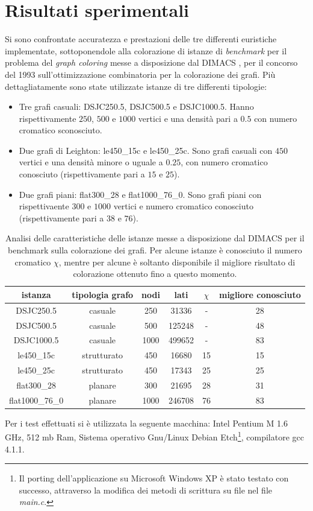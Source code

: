 \documentclass[a4paper,10pt]{article}
\begin{document}
\section{Risultati sperimentali}
Si sono confrontate accuratezza e prestazioni delle tre differenti euristiche implementate, sottoponendole alla colorazione di istanze di \emph{benchmark} per il problema del \emph{graph coloring} messe a disposizione dal DIMACS \cite{dimacs}, per il concorso del 1993 sull'ottimizzazione combinatoria per la colorazione dei grafi.
Più dettagliatamente sono state utilizzate istanze di tre differenti tipologie:
\begin{itemize}
    \item Tre grafi casuali: DSJC250.5, DSJC500.5 e DSJC1000.5. Hanno rispettivamente $250$, $500$ e $1000$ vertici e una densità pari a $0.5$ con numero cromatico sconosciuto.
    \item Due grafi di Leighton: le450\_15c e le450\_25c. Sono grafi casuali con $450$ vertici e una densità minore o uguale a $0.25$, con numero cromatico conosciuto (rispettivamente pari a $15$ e $25$).
    \item Due grafi piani: flat300\_28 e flat1000\_76\_0. Sono grafi piani con rispettivaente $300$ e $1000$ vertici e numero cromatico conosciuto (rispettivamente pari a $38$ e $76$).
\end{itemize}

\begin{table}[h]
\begin{center}
\begin{tabular}{|c|c|c|c|c|c|}
\hline
istanza         &tipologia grafo     &nodi   &lati   &$\chi$ &migliore conosciuto\\
\hline
DSJC250.5       &casuale             &250    &31336  &-      & 28\\
DSJC500.5       &casuale             &500    &125248 &-      & 48\\
DSJC1000.5      &casuale             &1000   &499652 &-      & 83\\
le450\_15c      &strutturato         &450    &16680  &15     & 15\\
le450\_25c      &strutturato         &450    &17343  &25     & 25\\
flat300\_28     &planare             &300    &21695  &28     & 31\\
flat1000\_76\_0 &planare             &1000   &246708 &76     & 83\\
\hline
\end{tabular}
\caption{Analisi delle caratteristiche delle istanze messe a disposizione dal DIMACS per il benchmark sulla colorazione dei grafi. Per alcune istanze è conosciuto il numero cromatico $\chi$, mentre per alcune è soltanto disponibile il migliore risultato di colorazione ottenuto fino a questo momento.}
\label{tab:instance}
\end{center}
\end{table}
Per i test effettuati si è utilizzata la seguente macchina: Intel Pentium M 1.6 GHz, 512 mb Ram, Sistema operativo Gnu/Linux Debian Etch\footnote{Il porting dell'applicazione su Microsoft Windows XP è stato testato con successo, attraverso la modifica dei metodi di scrittura su file nel file \emph{main.c}.}, compilatore gcc 4.1.1.
\end{document}
